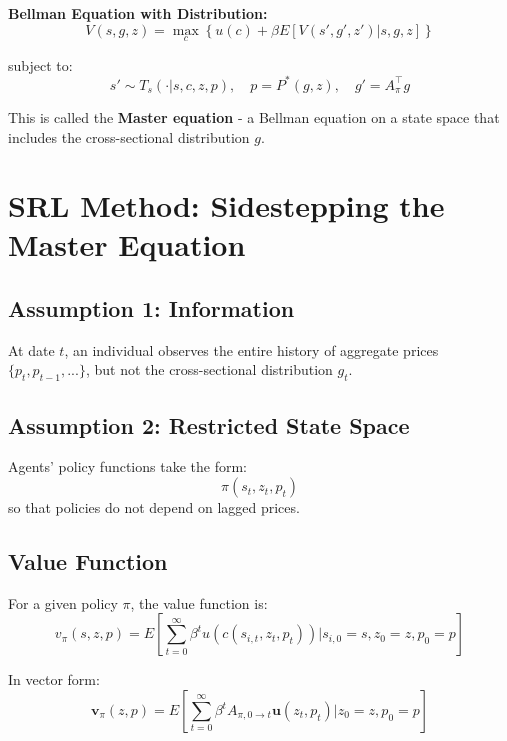 \documentclass[12pt,a4paper]{article}
\begin{document}
\textbf{Bellman Equation with Distribution:}
\begin{equation}
V(s, g, z) = \max_c \left\{ u(c) + \beta E[V(s', g', z') | s, g, z] \right\}
\end{equation}

subject to:
\begin{equation}
s' \sim T_s(\cdot|s, c, z, p), \quad p = P^*(g, z), \quad g' = A_\pi^\top g
\end{equation}

This is called the \textbf{Master equation} - a Bellman equation on a state space that includes the cross-sectional distribution $g$.

\section{SRL Method: Sidestepping the Master Equation}

\subsection{Assumption 1: Information}

At date $t$, an individual observes the entire history of aggregate prices $\{p_t, p_{t-1}, ...\}$, but not the cross-sectional distribution $g_t$.

\subsection{Assumption 2: Restricted State Space}

Agents' policy functions take the form:
\begin{equation}
\pi(s_t, z_t, p_t)
\end{equation}
so that policies do not depend on lagged prices.

\subsection{Value Function}

For a given policy $\pi$, the value function is:
\begin{equation}
v_\pi(s, z, p) = E \left[ \sum_{t=0}^{\infty} \beta^t u(c(s_{i,t}, z_t, p_t)) \Big| s_{i,0}=s, z_0=z, p_0=p \right]
\end{equation}

In vector form:
\begin{equation}
\mathbf{v}_\pi(z, p) = E \left[ \sum_{t=0}^{\infty} \beta^t A_{\pi,0\to t} \mathbf{u}(z_t, p_t) \Big| z_0=z, p_0=p \right]
\end{equation}
\end{document}
